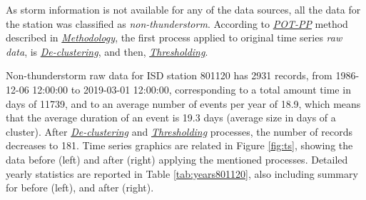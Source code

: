 \documentclass[12pt,twoside]{reedthesis}
\begin{document}
As storm information is not available for any of the data sources, all the data for the station was classified as \emph{non-thunderstorm}. According to \emph{\protect\hyperlink{pot-pp}{POT-PP}} method described in \emph{\protect\hyperlink{rmd-method}{Methodology}}, the first process applied to original time series \emph{raw data}, is \emph{\protect\hyperlink{decluster}{De-clustering}}, and then, \emph{\protect\hyperlink{thresholding}{Thresholding}}.

Non-thunderstorm raw data for ISD station 801120 has 2931 records, from 1986-12-06 12:00:00 to 2019-03-01 12:00:00, corresponding to a total amount time in days of 11739, and to an average number of events per year of 18.9, which means that the average duration of an event is 19.3 days (average size in days of a cluster). After \emph{\protect\hyperlink{decluster}{De-clustering}} and \emph{\protect\hyperlink{thresholding}{Thresholding}} processes, the number of records decreases to 181. Time series graphics are related in Figure \ref{fig:ts}, showing the data before (left) and after (right) applying the mentioned processes. Detailed yearly statistics are reported in Table \ref{tab:years801120}, also including summary for before (left), and after (right).
\end{document}
